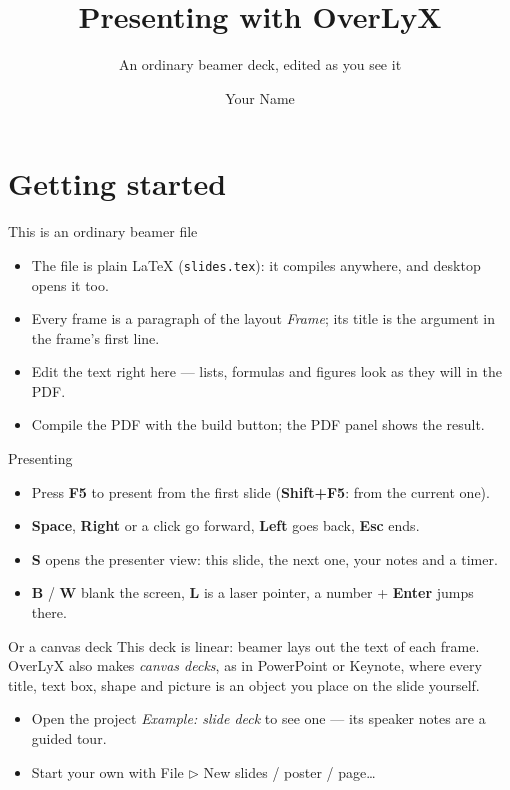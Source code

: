 \documentclass[aspectratio=169]{beamer}
\begin{document}
\title{Presenting with OverLyX}
\subtitle{An ordinary beamer deck, edited as you see it}
\author{Your Name}
\section{Getting started}

\begin{frame}{This is an ordinary beamer file}
\begin{itemize}
\item The file is plain \LaTeX{} (\texttt{slides.tex}): it compiles anywhere, and desktop \LyX{} opens it too.
\item Every frame is a paragraph of the layout \emph{Frame}; its title is the argument in the frame's first line.
\item Edit the text right here --- lists, formulas and figures look as they will in the PDF.
\item Compile the PDF with the build button; the PDF panel shows the result.
\end{itemize}
\end{frame}

\begin{frame}{Presenting}
\begin{itemize}
\item Press \textbf{F5} to present from the first slide (\textbf{Shift+F5}: from the current one).
\item \textbf{Space}, \textbf{Right} or a click go forward, \textbf{Left} goes back, \textbf{Esc} ends.
\item \textbf{S} opens the presenter view: this slide, the next one, your notes and a timer.
\item \textbf{B} / \textbf{W} blank the screen, \textbf{L} is a laser pointer, a number + \textbf{Enter} jumps there.
\end{itemize}
\end{frame}

\begin{frame}{Or a canvas deck}
This deck is linear: beamer lays out the text of each frame. OverLyX also makes \emph{canvas decks}, as in PowerPoint or Keynote, where every title, text box, shape and picture is an object you place on the slide yourself.
\begin{itemize}
\item Open the project \emph{Example: slide deck} to see one --- its speaker notes are a guided tour.
\item Start your own with File $\triangleright$ New slides / poster / page\ldots{}
\end{itemize}
\end{frame}
\end{document}
